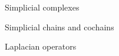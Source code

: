 \documentclass[../main.tex]{subfiles}
\begin{document}
    \begin{section}{Simplicial complexes} 
            
    \end{section}
    \begin{section}{Simplicial chains and cochains}
            
    \end{section}
    \begin{section}{Laplacian operators}
         
    \end{section}
\end{document}
